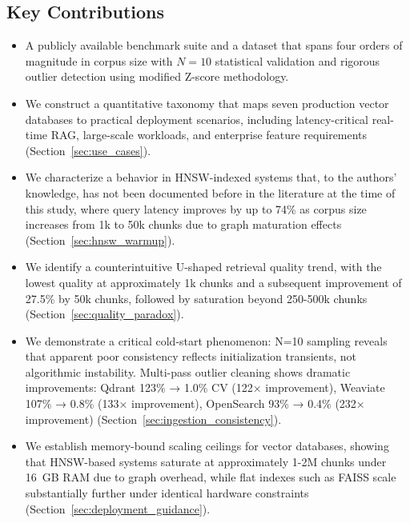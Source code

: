 \documentclass{article}
\begin{document}
\subsection{Key Contributions}
\begin{itemize}
    \item A publicly available benchmark suite \cite{kwaai2025benchmark} and a dataset that spans four orders of magnitude in corpus size with $N=10$ statistical validation and rigorous outlier detection using modified Z-score methodology.
    \item We construct a quantitative taxonomy that maps seven production vector databases to practical deployment scenarios, including latency-critical real-time RAG, large-scale workloads, and enterprise feature requirements (Section~\ref{sec:use_cases}).
    \item We characterize a behavior in HNSW-indexed systems that, to the authors' knowledge, has not been documented before in the literature at the time of this study, where query latency improves by up to 74\% as corpus size increases from 1k to 50k chunks due to graph maturation effects (Section~\ref{sec:hnsw_warmup}).
    \item We identify a counterintuitive U-shaped retrieval quality trend, with the lowest quality at approximately 1k chunks and a subsequent improvement of 27.5\% by 50k chunks, followed by saturation beyond 250-500k chunks (Section~\ref{sec:quality_paradox}).
    \item We demonstrate a critical cold-start phenomenon: N=10 sampling reveals that apparent poor consistency reflects initialization transients, not algorithmic instability. Multi-pass outlier cleaning shows dramatic improvements: Qdrant 123\% → 1.0\% CV (122× improvement), Weaviate 107\% → 0.8\% (133× improvement), OpenSearch 93\% → 0.4\% (232× improvement) (Section~\ref{sec:ingestion_consistency}).
    \item We establish memory-bound scaling ceilings for vector databases, showing that HNSW-based systems saturate at approximately 1-2M chunks under 16~GB RAM due to graph overhead, while flat indexes such as FAISS scale substantially further under identical hardware constraints (Section~\ref{sec:deployment_guidance}).    
\end{itemize}
\end{document}
